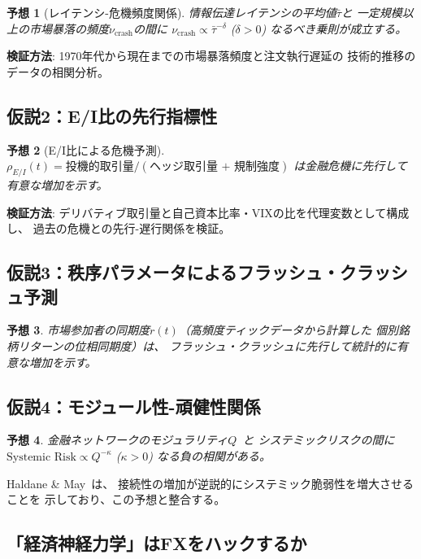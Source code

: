 \documentclass[12pt,twocolumn]{ltjsarticle}
\newtheorem{conjecture}{予想}
\begin{document}
\begin{conjecture}[レイテンシ-危機頻度関係]
情報伝達レイテンシの平均値$\bar{\tau}$と
一定規模以上の市場暴落の頻度$\nu_{\text{crash}}$の間に
$\nu_{\text{crash}} \propto \bar{\tau}^{-\delta}$ ($\delta > 0$)
なるべき乗則が成立する。
\end{conjecture}
\textbf{検証方法}:
1970年代から現在までの市場暴落頻度と注文執行遅延の
技術的推移のデータの相関分析。

\subsection{仮説2：E/I比の先行指標性}

\begin{conjecture}[E/I比による危機予測]
$\rho_{E/I}(t) = \text{投機的取引量} / (\text{ヘッジ取引量 + 規制強度})$
は金融危機に先行して有意な増加を示す。
\end{conjecture}
\textbf{検証方法}:
デリバティブ取引量と自己資本比率・VIXの比を代理変数として構成し、
過去の危機との先行-遅行関係を検証。

\subsection{仮説3：秩序パラメータによるフラッシュ・クラッシュ予測}

\begin{conjecture}
市場参加者の同期度$r(t)$（高頻度ティックデータから計算した
個別銘柄リターンの位相同期度）は、
フラッシュ・クラッシュに先行して統計的に有意な増加を示す。
\end{conjecture}

\subsection{仮説4：モジュール性-頑健性関係}

\begin{conjecture}
金融ネットワークのモジュラリティ$Q$~\cite{Newman2006}と
システミックリスクの間に
$\text{Systemic Risk} \propto Q^{-\kappa}$ ($\kappa > 0$)
なる負の相関がある。
\end{conjecture}
Haldane \& May~\cite{Haldane2011}は、
接続性の増加が逆説的にシステミック脆弱性を増大させることを
示しており、この予想と整合する。

\subsection{「経済神経力学」はFXをハックするか}
\end{document}
